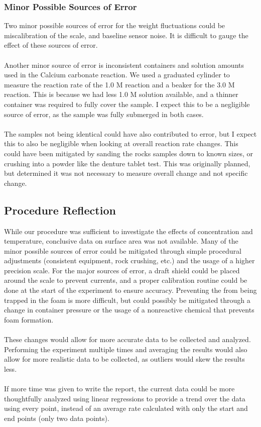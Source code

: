 \subsubsection{Minor Possible Sources of Error}
Two minor possible sources of error for the weight fluctuations could be miscalibration of the scale, and baseline sensor noise. It is difficult to gauge the effect of these sources of error.
\\~\\
Another minor source of error is inconsistent containers and solution amounts used in the Calcium carbonate reaction. We used a graduated cylinder to measure the reaction rate of the 1.0 M  reaction and a beaker for the 3.0 M  reaction. This is because we had less 1.0 M  solution available, and a thinner container was required to fully cover the  sample. I expect this to be a negligible source of error, as the  sample was fully submerged in both cases.
\\~\\
The  samples not being identical could have also contributed to error, but I expect this to also be negligible when looking at overall reaction rate changes. This could have been mitigated by sanding the rocks samples down to known sizes, or crushing into a powder like the denture tablet test. This was originally planned, but determined it was not necessary to measure overall change and not specific change.

\subsection{Procedure Reflection}
While our procedure was sufficient to investigate the effects of concentration and temperature, conclusive data on surface area was not available. Many of the minor possible sources of error could be mitigated through simple procedural adjustments (consistent equipment, rock crushing, etc.) and the usage of a higher precision scale. For the major sources of error, a draft shield could be placed around the scale to prevent currents, and a proper calibration routine could be done at the start of the experiment to ensure accuracy. Preventing the  from being trapped in the foam is more difficult, but could possibly be mitigated through a change in container pressure or the usage of a nonreactive chemical that prevents foam formation.
\\~\\
These changes would allow for more accurate data to be collected and analyzed. Performing the experiment multiple times and averaging the results would also allow for more realistic data to be collected, as outliers would skew the results less.
\\~\\
If more time was given to write the report, the current data could be more thoughtfully analyzed using linear regressions to provide a trend over the data using every point, instead of an average rate calculated with only the start and end points (only two data points).

